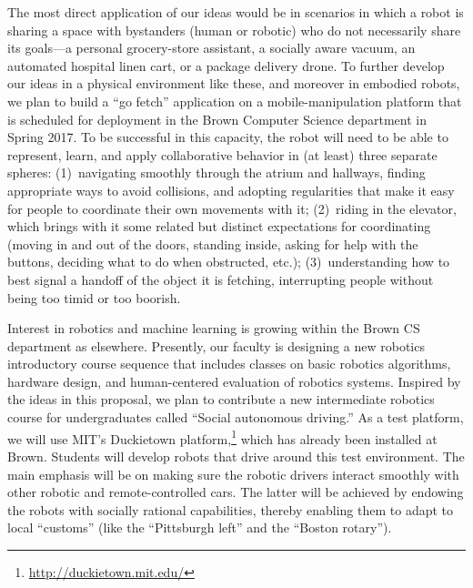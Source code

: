 The most direct application of our ideas would be in scenarios in
which a robot is sharing a space with bystanders (human or robotic)
who do not necessarily share its goals---a personal grocery-store
assistant, a socially aware vacuum, an automated hospital linen cart, or
a package delivery drone.  To further develop our ideas in a physical
environment like these, and moreover in embodied robots,
we plan to build a ``go fetch'' application on a mobile-manipulation
platform that is scheduled for deployment in the Brown Computer
Science department in Spring 2017.  To be successful in this capacity,
the robot will need to be able to represent, learn, and apply
collaborative behavior in (at least) three separate spheres:
%
(1)~navigating smoothly through the atrium and hallways, finding
  appropriate ways to avoid collisions, and adopting regularities that
  make it easy for people to coordinate their own movements with it;
%
(2)~riding in the elevator, which brings with it some related but
  distinct expectations for coordinating (moving in and out of the
  doors, standing inside, asking for help with the buttons, deciding
  what to do when obstructed, etc.);
%
(3)~understanding how to best signal a handoff of the object it is
  fetching, interrupting people without being too timid or too
  boorish.


% 

% 


Interest in robotics and machine learning is growing within the Brown
CS department as elsewhere.  Presently, our faculty is designing a new robotics
introductory course sequence that includes classes on basic robotics
algorithms, hardware design, and human-centered evaluation of robotics
systems.  Inspired by the ideas in this proposal, we plan to
contribute a new intermediate robotics course for
undergraduates called ``Social autonomous driving.''  As a test
platform, we will use MIT's Duckietown
platform,\footnote{\url{http://duckietown.mit.edu/}} which has already
been installed at Brown.  Students will develop robots that drive
around this test environment.  The main emphasis will be on making
sure the robotic drivers interact smoothly with other robotic and
remote-controlled cars.  The latter will be achieved by endowing the
robots with socially rational capabilities, thereby enabling them to
adapt to local ``customs''
(like the ``Pittsburgh left'' and the ``Boston rotary'').

